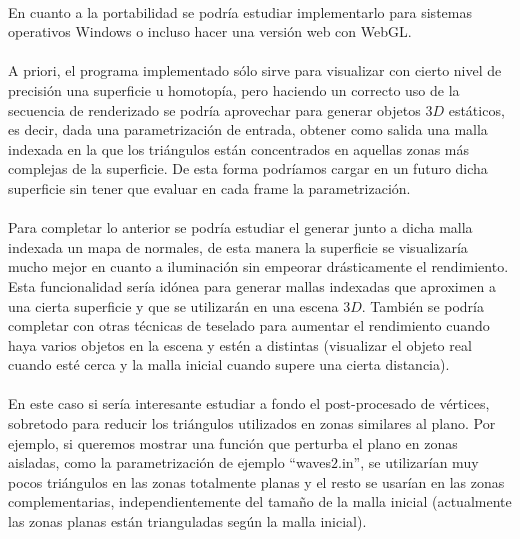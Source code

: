 \\En cuanto a la portabilidad se podría estudiar implementarlo para sistemas operativos Windows o incluso hacer una versión web con WebGL.\\
\\A priori, el programa implementado sólo sirve para visualizar con cierto nivel de precisión una superficie u homotopía, pero haciendo un correcto uso de la secuencia de renderizado se podría aprovechar para generar objetos $3D$ estáticos, es decir, dada una parametrización de entrada, obtener como salida una malla indexada en la que los triángulos están concentrados en aquellas zonas más complejas de la superficie. De esta forma podríamos cargar en un futuro dicha superficie sin tener que evaluar en cada frame la parametrización.\\
\\Para completar lo anterior se podría estudiar el generar junto a dicha malla indexada un mapa de normales, de esta manera la superficie se visualizaría mucho mejor en cuanto a iluminación sin empeorar drásticamente el rendimiento. Esta funcionalidad sería idónea para generar mallas indexadas que aproximen a una cierta superficie y que se utilizarán en una escena $3D$. También se podría completar con otras técnicas de teselado para aumentar el rendimiento cuando haya varios objetos en la escena y estén a distintas (visualizar el objeto real cuando esté cerca y la malla inicial cuando supere una cierta distancia).\\
\\En este caso si sería interesante estudiar a fondo el post-procesado de vértices, sobretodo para reducir los triángulos utilizados en zonas similares al plano. Por ejemplo, si queremos mostrar una función que perturba el plano en zonas aisladas, como la parametrización de ejemplo ``waves$2$.in'', se utilizarían muy pocos triángulos en las zonas totalmente planas y el resto se usarían en las zonas complementarias, independientemente del tamaño de la malla inicial (actualmente las zonas planas están trianguladas según la malla inicial).

\endinput
